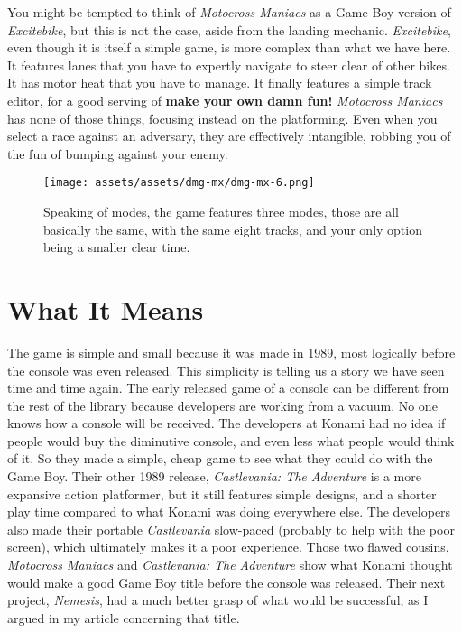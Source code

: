 \documentclass{book}
\begin{document}
You might be tempted to think of \emph{Motocross Maniacs} as a Game Boy version of \emph{Excitebike}, but this is not the case, aside from the landing mechanic. \emph{Excitebike}, even though it is itself a simple game, is more complex than what we have here. It features lanes that you have to expertly navigate to steer clear of other bikes. It has motor heat that you have to manage. It finally features a simple track editor, for a good serving of \textbf{make your own damn fun!} \emph{Motocross Maniacs} has none of those things, focusing instead on the platforming. Even when you select a race against an adversary, they are effectively intangible, robbing you of the fun of bumping against your enemy.

\begin{figure}[hbt]
\vskip 10pt
\centering \texttt{[image: assets/assets/dmg-mx/dmg-mx-6.png]}\par\pagetwodescription Speaking of modes, the game features three modes, those are all basically the same, with the same eight tracks, and your only option being a smaller clear time.
\vskip 6pt
\end{figure}

\FloatBarrier\needspace{5pt}\section*{What It Means}\nopagebreak[4]

The game is simple and small because it was made in 1989, most logically before the console was even released. This simplicity is telling us a story we have seen time and time again. The early released game of a console can be different from the rest of the library because developers are working from a vacuum. No one knows how a console will be received. The developers at Konami had no idea if people would buy the diminutive console, and even less what people would think of it. So they made a simple, cheap game to see what they could do with the Game Boy. Their other 1989 release, \emph{Castlevania: The Adventure} is a more expansive action platformer, but it still features simple designs, and a shorter play time compared to what Konami was doing everywhere else. The developers also made their portable \emph{Castlevania} slow-paced (probably to help with the poor screen), which ultimately makes it a poor experience. Those two flawed cousins, \emph{Motocross Maniacs} and \emph{Castlevania: The Adventure} show what Konami thought would make a good Game Boy title before the console was released. Their next project, \emph{Nemesis}, had a much better grasp of what would be successful, as I argued in my article concerning that title.
\end{document}
